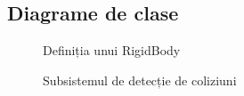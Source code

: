\documentclass[12pt,a4paper]{report}
\begin{document}
\begin{appendices}
\chapter{Diagrame de clase}
\begin{figure}[H]
	\centering
	\caption[asdfas]{Definiția unui RigidBody}
	\label{fig:RigidBody}
\end{figure}

\begin{figure}[H]
	\centering
	\caption[]{Subsistemul de detecție de coliziuni}
	\label{fig:CollisionDetection}
\end{figure}


\end{appendices}
\end{document}
